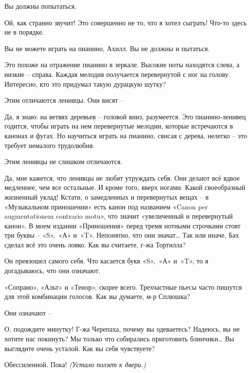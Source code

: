 \documentclass[../main.tex]{subfiles}
\begin{document}
\begin{dialogue}
 Вы должны попытаться.


 Ой, как странно звучит! Это совершенно не то, что я хотел сыграть! Что-то здесь не в порядке.

 Вы не можете играть на пианино, Ахилл. Вы не должны и пытаться.

 Это похоже на отражение пианино в зеркале. Высокие ноты находятся слева, а низкие \--- справа. Каждая мелодия получается перевернутой с ног на голову. Интересно, кто это придумал такую дурацкую шутку?

 Этим отличаются ленивцы. Они висят \---

 Да, я знаю: на ветвях деревьев \--- головой вниз, разумеется. Это пианино-ленивец годится, чтобы играть на нем перевернутые мелодии, которые встречаются в канонах и фугах. Но научиться играть на пианино, свисая с дерева, нелегко \--- это требует немалого трудолюбия.

 Этим ленивцы не слишком отличаются.

 Да, мне кажется, что ленивцы не любят утруждать себя. Они делают всё вдвое медленнее, чем все остальные. И кроме того, вверх ногами. Какой своеобразный жизненный уклад! Кстати, о замедленных и перевернутых вещах \--- в «Музыкальном приношении» есть канон под названием «Canon per augmentationem contrario motu», что значит «увеличенный и перевернутый канон». В моем издании «Приношения» перед тремя нотными строчками стоят три буквы \--- «S»,~«А» и~«T». Непонятно, что они значат\ldots{} Так или иначе, Бах сделал всё это очень ловко. Как вы считаете, г-жа Тортилла?

 Он превзошел самого себя. Что касается букв «S»,~«А» и~«T», то я догадываюсь, что они означают.

 «Сопрано», «Альт» и «Тенор», скорее всего. Трехчастные пьесы часто пишутся для этой комбинации голосов. Как вы думаете, м-р Сплюшка?

 Они означают \---

 О, подождите минутку! Г-жа Черепаха, почему вы одеваетесь? Надеюсь, вы не хотите нас покинуть? Мы только что собирались приготовить блинчики\ldots{} Вы выглядите очень усталой. Как вы себя чувствуете?

 Обессиленной. Пока! \emph{(Устало ползет к двери.)}


\end{dialogue}
\end{document}
